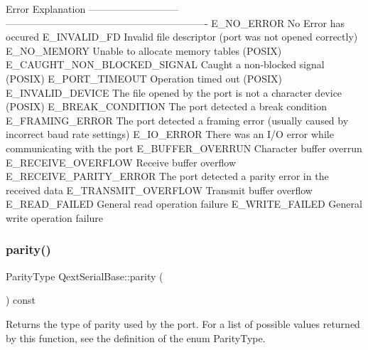 \begin{DoxyVerb}Error                           Explanation
---------------------------     -------------------------------------------------------------
E_NO_ERROR                      No Error has occured
E_INVALID_FD                    Invalid file descriptor (port was not opened correctly)
E_NO_MEMORY                     Unable to allocate memory tables (POSIX)
E_CAUGHT_NON_BLOCKED_SIGNAL     Caught a non-blocked signal (POSIX)
E_PORT_TIMEOUT                  Operation timed out (POSIX)
E_INVALID_DEVICE                The file opened by the port is not a character device (POSIX)
E_BREAK_CONDITION               The port detected a break condition
E_FRAMING_ERROR                 The port detected a framing error
                                (usually caused by incorrect baud rate settings)
E_IO_ERROR                      There was an I/O error while communicating with the port
E_BUFFER_OVERRUN                Character buffer overrun
E_RECEIVE_OVERFLOW              Receive buffer overflow
E_RECEIVE_PARITY_ERROR          The port detected a parity error in the received data
E_TRANSMIT_OVERFLOW             Transmit buffer overflow
E_READ_FAILED                   General read operation failure
E_WRITE_FAILED                  General write operation failure
\end{DoxyVerb}
 \mbox{\label{class_qext_serial_base_a7b35a11a804f9ee86b07db8a5b5bc0ee}} 
\subsubsection{\texorpdfstring{parity()}{parity()}}
{\footnotesize\ttfamily Parity\+Type Qext\+Serial\+Base\+::parity (\begin{DoxyParamCaption}{ }\end{DoxyParamCaption}) const\hspace{0.3cm}{\ttfamily [virtual]}}

Returns the type of parity used by the port. For a list of possible values returned by this function, see the definition of the enum Parity\+Type. \mbox{\label{class_qext_serial_base_a5ec73bcceef66b910bd42a1ab0b6b66f}} 
